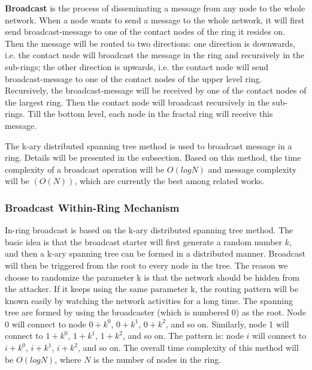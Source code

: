 \textbf{Broadcast} is the process of disseminating a message from any node to the whole network. When a node wants to send a message to the whole network, it will first send broadcast-message to one of the contact nodes of the ring it resides on. Then the message will be routed to two directions: one direction is downwards, i.e. the contact node will broadcast the message in the ring and recursively in the sub-rings; the other direction is upwards, i.e. the contact node will send broadcast-message to one of the contact nodes of the upper level ring. Recursively, the broadcast-message will be received by one of the contact nodes of the largest ring. Then the contact node will broadcast recursively in the sub-rings. Till the bottom level, each node in the fractal ring will receive this message.

The k-ary distributed spanning tree method \cite{el2003efficient} is used to broadcast message in a ring. Details will be presented in the subsection. Based on this method, the time complexity of a broadcast operation will be $O(logN)$ and message complexity will be $(O(N))$, which are currently the best among related works.

\subsubsection{Broadcast Within-Ring Mechanism}

In-ring broadcast is based on the k-ary distributed spanning tree method. The basic idea is that the broadcast starter will first generate a random number $k$, and then a k-ary spanning tree can be formed in a distributed manner. Broadcast will then be triggered from the root to every node in the tree. The reason we choose to randomize the parameter k is that the network should be hidden from the attacker. If it keeps using the same parameter k, the routing pattern will be known easily by watching the network activities for a long time. The spanning tree are formed by using the broadcaster (which is numbered 0) as the root. Node 0 will connect to node $0+k^0$, $0+k^1$, $0+k^2$, and so on. Similarly, node 1 will connect to $1+k^0$, $1+k^1$, $1+k^2$, and so on. The pattern is: node $i$ will connect to $i+k^0$, $i+k^1$, $i+k^2$, and so on. The overall time complexity of this method will be $O(logN)$, where $N$ is the number of nodes in the ring.

